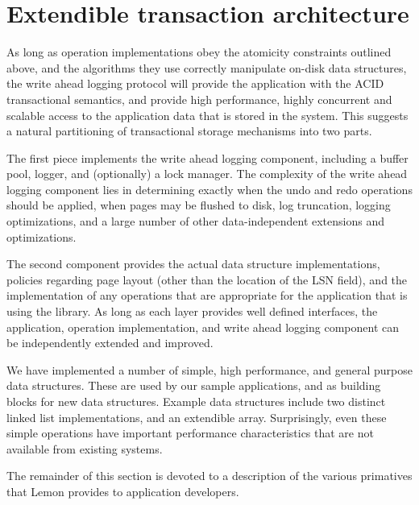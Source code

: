 \documentclass[letterpaper,twocolumn,english]{article}
\newcommand{\yad}{Lemon\xspace}
\begin{document}

\section{Extendible transaction architecture}

As long as operation implementations obey the atomicity constraints
outlined above, and the algorithms they use correctly manipulate
on-disk data structures, the write ahead logging protocol will provide
the application with the ACID transactional semantics, and provide
high performance, highly concurrent and scalable access to the
application data that is stored in the system.  This suggests a
natural partitioning of transactional storage mechanisms into two
parts.

The first piece implements the write ahead logging component,
including a buffer pool, logger, and (optionally) a lock manager.  
The complexity of the write ahead logging component lies in
determining exactly when the undo and redo operations should be
applied, when pages may be flushed to disk, log truncation, logging
optimizations, and a large number of other data-independent extensions
and optimizations.

The second component provides the actual data structure
implementations, policies regarding page layout (other than the
location of the LSN field), and the implementation of any operations
that are appropriate for the application that is using the library.
As long as each layer provides well defined interfaces, the application, 
operation implementation, and write ahead logging component can be 
independently extended and improved.

We have implemented a number of simple, high performance,
and general purpose data structures.  These are used by our sample
applications, and as building blocks for new data structures.  Example
data structures include two distinct linked list implementations, and
an extendible array.  Surprisingly, even these simple operations have
important performance characteristics that are not available from
existing systems.

The remainder of this section is devoted to a description of the
various primatives that \yad provides to application developers.
\end{document}
